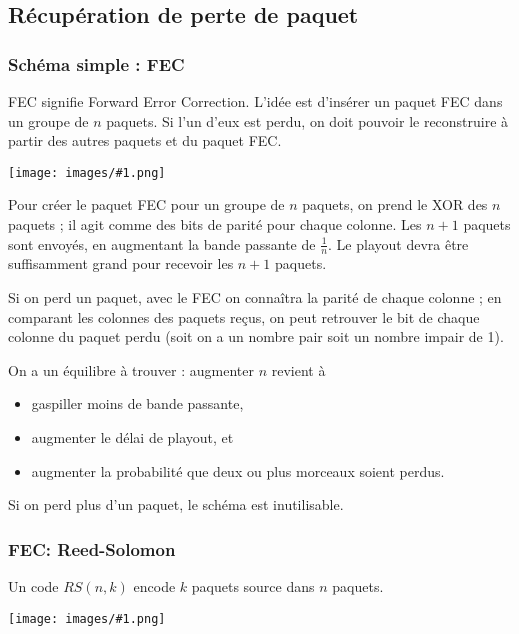 \documentclass[10pt,a4paper]{report}
\newcommand{\dessinS}[2]{\begin{center}\texttt{[image: images/\#1.png]}\end{center}}
\begin{document}
	
	
		\subsection{Récupération de perte de paquet}
		
			\subsubsection{Schéma simple : FEC}
			
			FEC signifie Forward Error Correction. L'idée est d'insérer un paquet FEC dans un groupe de $n$ paquets. Si l'un d'eux est perdu, on doit pouvoir le reconstruire à partir des autres paquets et du paquet FEC.
			
			\dessinS{80}{.65}
				
			Pour créer le paquet FEC pour un groupe de $n$ paquets, on prend le XOR des $n$ paquets ; il agit comme des bits de parité pour chaque colonne. Les $n + 1$ paquets sont envoyés, en augmentant la bande passante de $\frac{1}{n}$. Le playout devra être suffisamment grand pour recevoir les $n + 1$ paquets.
			
			Si on perd un paquet, avec le FEC on connaîtra la parité de chaque colonne ; en comparant les colonnes des paquets reçus, on peut retrouver le bit de chaque colonne du paquet perdu (soit on a un nombre pair soit un nombre impair de 1).
		
			
			On a un équilibre à trouver : augmenter $n$ revient à
			
			\begin{itemize}
				\item gaspiller moins de bande passante,
				\item augmenter le délai de playout, et
				\item augmenter la probabilité que deux ou plus morceaux soient perdus.
			\end{itemize}
		
			Si on perd plus d'un paquet, le schéma est inutilisable.
			
		
			\subsubsection{FEC: Reed-Solomon}
			
			Un code $RS(n,k)$ encode $k$ paquets source dans $n$ paquets.
			
			\dessinS{81}{.65}		
			
\end{document}
